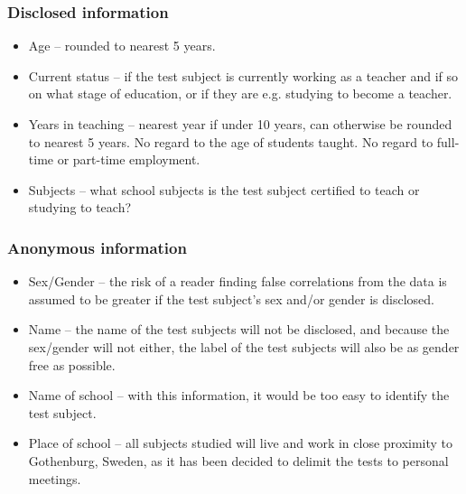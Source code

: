 \subsubsection*{Disclosed information}
    \begin{itemize} %
    \item Age – rounded to nearest 5 years.
    \item Current status – if the test subject is currently working as a teacher and if so on what stage of education, or if they are e.g. studying to become a teacher.
    \item Years in teaching – nearest year if under 10 years, can otherwise be rounded to nearest 5 years. No regard to the age of students taught. No regard to full-time or part-time employment.
    \item Subjects – what school subjects is the test subject certified to teach or studying to teach?
\end{itemize}

\subsubsection*{Anonymous information}
\begin{itemize} %
    \item Sex/Gender – the risk of a reader finding false correlations from the data is assumed to be greater if the test subject’s sex and/or gender is disclosed.
    \item Name – the name of the test subjects will not be disclosed, and because the sex/gender will not either, the label of the test subjects will also be as gender free as possible.
    \item Name of school – with this information, it would be too easy to identify the test subject.
    \item Place of school – all subjects studied will live and work in close proximity to Gothenburg, Sweden, as it has been decided to delimit the tests to personal meetings.
\end{itemize}

